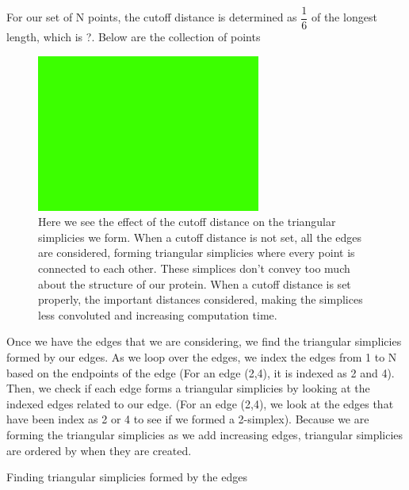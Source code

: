 \documentclass[12pt, a4paper, twocolumn, fullpage]{article}
\theoremstyle{plain}
\theoremstyle{definition}
\theoremstyle{remark}
\begin{document}
For our set of N points, the cutoff distance is determined as $\dfrac{1}{6}$ of the longest length, which is ?. Below are the collection of points 

\begin{figure}[t]
    \includegraphics[width=\linewidth]{img/blank.png}
    \caption{Here we see the effect of the cutoff distance on the triangular simplicies we form. When a cutoff distance is not set, all the edges are considered, forming triangular simplicies where every point is connected to each other. These simplices don't convey too much about the structure of our protein. When a cutoff distance is set properly, the important distances considered, making the simplices less convoluted and increasing computation time.}
    \label{Effect of cutoff}
\end{figure}

Once we have the edges that we are considering, we find the triangular simplicies formed by our edges. As we loop over the edges, we index the edges from 1 to N based on the endpoints of the edge (For an edge (2,4),   it is indexed as 2 and 4). Then, we check if each edge forms a triangular simplicies by looking at the indexed edges related to our edge. (For an edge (2,4), we look at the edges that have been index as 2 or 4 to see if we formed a 2-simplex). Because we are forming the triangular simplicies as we add increasing edges, triangular simplicies are ordered by when they are created. 

\begin{algorithm}
\caption{Finding triangular simplicies formed by the edges}
\begin{algorithmic}
    \ENDFOR
\ENDFOR
\end{algorithmic}
\end{algorithm}
\end{document}
